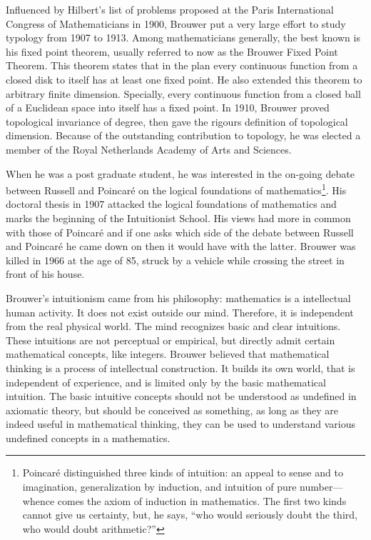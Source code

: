 \documentclass{article}
\begin{document}
Influenced by Hilbert's list of problems proposed at the Paris International Congress of Mathematicians in 1900, Brouwer put a very large effort to study typology from 1907 to 1913. Among mathematicians generally, the best known is his fixed point theorem, usually referred to now as the Brouwer Fixed Point Theorem. This theorem states that in the plan every continuous function from a closed disk to itself has at least one fixed point. He also extended this theorem to arbitrary finite dimension. Specially, every continuous function from a closed ball of a Euclidean space into itself has a fixed point. In 1910, Brouwer proved topological invariance of degree, then gave the rigours definition of topological dimension. Because of the outstanding contribution to topology, he was elected a member of the Royal Netherlands Academy of Arts and Sciences.

When he was a post graduate student, he was interested in the on-going debate between Russell and Poincaré on the logical foundations of mathematics\footnote{Poincaré distinguished three kinds of intuition: an appeal to sense and to imagination, generalization by induction, and intuition of pure number—whence comes the axiom of induction in mathematics. The first two kinds cannot give us certainty, but, he says, ``who would seriously doubt the third, who would doubt arithmetic?''\cite{Poincare2}}. His doctoral thesis in 1907 attacked the logical foundations of mathematics and marks the beginning of the Intuitionist School. His views had more in common with those of Poincaré and if one asks which side of the debate between Russell and Poincaré he came down on then it would have with the latter. Brouwer was killed in 1966 at the age of 85, struck by a vehicle while crossing the street in front of his house.

Brouwer's intuitionism came from his philosophy: mathematics is a intellectual human activity. It does not exist outside our mind. Therefore, it is independent from the real physical world. The mind recognizes basic and clear intuitions. These intuitions are not perceptual or empirical, but directly admit certain mathematical concepts, like integers. Brouwer believed that mathematical thinking is a process of intellectual construction. It builds its own world, that is independent of experience, and is limited only by the basic mathematical intuition. The basic intuitive concepts should not be understood as undefined in axiomatic theory, but should be conceived as something, as long as they are indeed useful in mathematical thinking, they can be used to understand various undefined concepts in a mathematics.
\end{document}
